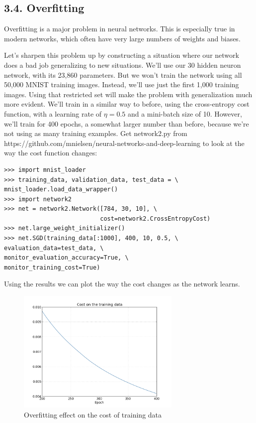 \documentclass[12 pt]{article}
\begin{document}
\subsection{3.4. Overfitting}\label{overfitting}

Overfitting is a major problem in neural networks. This is especially
true in modern networks, which often have very large numbers of weights
and biases.

Let's sharpen this problem up by constructing a situation where our
network does a bad job generalizing to new situations. We'll use our 30
hidden neuron network, with its 23,860 parameters. But we won't train
the network using all 50,000 MNIST training images. Instead, we'll use
just the first 1,000 training images. Using that restricted set will
make the problem with generalization much more evident. We'll train in a
similar way to before, using the cross-entropy cost function, with a
learning rate of $ \eta = 0.5 $ and a mini-batch size of 10. However,
we'll train for 400 epochs, a somewhat larger number than before,
because we're not using as many training examples. Get network2.py
from https://github.com/mnielsen/neural-networks-and-deep-learning
to look at the way the cost function changes:

\begin{verbatim}
>>> import mnist_loader
>>> training_data, validation_data, test_data = \
mnist_loader.load_data_wrapper()
>>> import network2
>>> net = network2.Network([784, 30, 10], \
                           cost=network2.CrossEntropyCost)
>>> net.large_weight_initializer()
>>> net.SGD(training_data[:1000], 400, 10, 0.5, \
evaluation_data=test_data, \
monitor_evaluation_accuracy=True, \
monitor_training_cost=True)
\end{verbatim}

Using the results we can plot the way the cost changes as the network
learns.

\begin{figure}[htp]
\centering
\includegraphics[width=0.7\textwidth]{./figs/overfitting1.png}
\caption{Overfitting effect on the cost of training data}
\end{figure}
\end{document}
